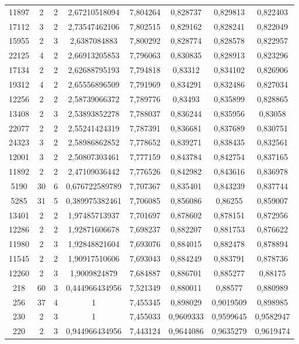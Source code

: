 \begin{longtable}{|c|c|c|c|c|c|c|c|}
11897 & 2 & 2 & 2,67210518094 & 7,804264 & 0,828737 & 0,829813 & 0,822403 \\
17112 & 3 & 2 & 2,73547462106 & 7,802515 & 0,829162 & 0,828241 & 0,822049 \\
15955 & 2 & 3 & 2,6387084883 & 7,800292 & 0,828774 & 0,828578 & 0,822957 \\
22125 & 4 & 2 & 2,66913205853 & 7,796063 & 0,830835 & 0,828913 & 0,823296 \\
17134 & 2 & 2 & 2,62688795193 & 7,794818 & 0,83312 & 0,834102 & 0,826906 \\
19312 & 4 & 2 & 2,65556896509 & 7,791969 & 0,834291 & 0,832486 & 0,827034 \\
12256 & 2 & 2 & 2,58739066372 & 7,789776 & 0,83493 & 0,835899 & 0,828865 \\
13408 & 2 & 3 & 2,53893852278 & 7,788037 & 0,836244 & 0,835956 & 0,83058 \\
22077 & 2 & 2 & 2,55241424319 & 7,787391 & 0,836681 & 0,837689 & 0,830751 \\
24323 & 3 & 2 & 2,58986862852 & 7,778652 & 0,839271 & 0,838435 & 0,832561 \\
12001 & 3 & 2 & 2,50807303461 & 7,777159 & 0,843784 & 0,842754 & 0,837165 \\
11892 & 2 & 2 & 2,47109036442 & 7,776526 & 0,842982 & 0,843616 & 0,836978 \\
5190 & 30 & 6 & 0,676722589789 & 7,707367 & 0,835401 & 0,843239 & 0,837744 \\
5285 & 31 & 5 & 0,389975382461 & 7,706085 & 0,856086 & 0,86255 & 0,859007 \\
13401 & 2 & 2 & 1,97485713937 & 7,701697 & 0,878602 & 0,878151 & 0,872956 \\
12286 & 2 & 2 & 1,92871606678 & 7,698237 & 0,882207 & 0,881753 & 0,876622 \\
11980 & 2 & 3 & 1,92848821604 & 7,693076 & 0,884015 & 0,882478 & 0,878894 \\
11545 & 2 & 2 & 1,90917510606 & 7,693043 & 0,884249 & 0,883791 & 0,878736 \\
12260 & 2 & 3 & 1,9009824879 & 7,684887 & 0,886701 & 0,885277 & 0,88175 \\
218 & 60 & 3 & 0,444966434956 & 7,521349 & 0,880011 & 0,88577 & 0,880989 \\
256 & 37 & 4 & 1 & 7,455345 & 0,898029 & 0,9019509 & 0,898985 \\
230 & 2 & 3 & 1 & 7,455033 & 0,9609333 & 0,9599645 & 0,9582947 \\
220 & 2 & 3 & 0,944966434956 & 7,443124 & 0,9644086 & 0,9635279 & 0,9619474 \\

\end{longtable}
